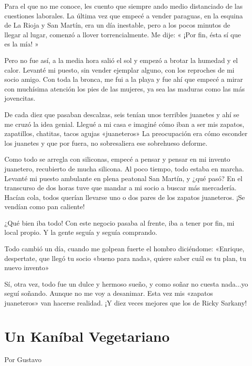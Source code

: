 \documentclass[11pt,twoside,openright,a5paper]{book}
\begin{document}
Para el que no me conoce, les cuento que siempre ando medio distanciado de las cuestiones laborales. La última vez que empecé a vender paraguas, en la esquina de La Rioja y San Martín, era un día inestable, pero a los pocos minutos de llegar al lugar, comenzó a llover torrencialmente. Me dije: « ¡Por fin, ésta sí que es la mía! »

Pero no fue así, a la media hora salió el sol y empezó a brotar la humedad y el calor. Levanté mi puesto, sin vender ejemplar alguno, con los reproches de mi socio amigo. Con toda la bronca, me fui a la playa y fue ahí que empecé a mirar con muchísima atención los pies de las mujeres, ya sea las maduras como las más jovencitas.

De cada diez que pasaban descalzas, seis tenían unos terribles juanetes y ahí se me cruzó la idea genial. Llegué a mi casa e imaginé cómo iban a ser mis zapatos, zapatillos, chatitas, tacos agujas «juaneteros» La preocupación era cómo esconder los juanetes y que por fuera, no sobresaliera ese sobrehueso deforme. 

Como todo se arregla con siliconas, empecé a pensar y pensar en mi invento juanetero, recubierto de mucha silicona. Al poco tiempo, todo estaba en marcha. Levanté mi puesto ambulante en plena peatonal San Martín, y ¿qué pasó? En el transcurso de dos horas tuve que mandar a mi socio a buscar más mercadería. Hacían cola, todos querían llevarse uno o dos pares de los zapatos juaneteros. ¡Se vendían como pan caliente!

¿Qué bien iba todo! Con este negocio pasaba al frente, iba a tener por fin, mi local propio. Y la gente seguía y seguía comprando.

Todo cambió un día, cuando me golpean fuerte el hombro diciéndome: «Enrique, despertate, que llegó tu socio «bueno para nada», quiere saber cuál es tu plan, tu nuevo invento»

Sí, otra vez,  todo fue un dulce y hermoso sueño, y como soñar no cuesta nada...yo seguí soñando. Aunque no me voy a desanimar. Esta vez mis «zapatos juaneteros» van hacerse realidad. ¡Y  diez veces mejores que los de Ricky Sarkany!

\section*{Un Kaníbal Vegetariano}

\begin{flushright}Por Gustavo\end{flushright}
\end{document}

